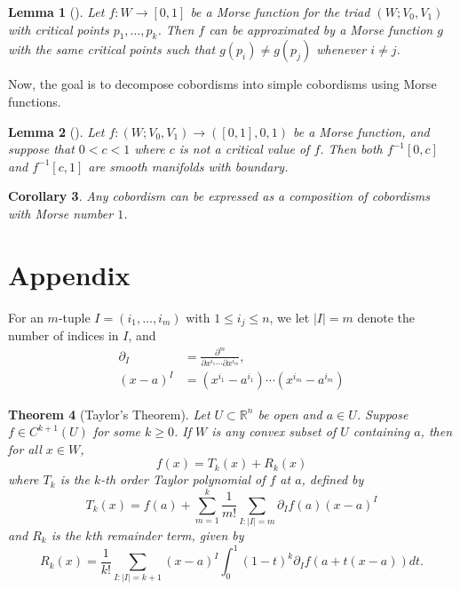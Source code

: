 \documentclass[reqno]{amsart}
\newtheorem{theorem}{Theorem}[section]
\newtheorem{lemma}[theorem]{Lemma}
\newtheorem{corollary}[theorem]{Corollary}
\theoremstyle{definition}
\theoremstyle{remark}
\begin{document}
   \begin{lemma}[]
       Let $f \colon W \to \left[ 0,1 \right] $ be a Morse
       function for the triad $\left( W;
       V_0,V_1\right) $ with critical points $p_1,\ldots,p_k$.
       Then $f$ can be approximated by a Morse function $g$ 
       with the same critical points such that
       $g\left( p_i \right)  \neq g\left( p_j \right) $ whenever
       $i \neq j$.
   \end{lemma}



   Now, the goal is to decompose cobordisms into
   simple cobordisms using Morse functions.

   \begin{lemma}[]
       Let $f \colon \left( W; V_0, V_1 \right) 
       \to \left( \left[ 0,1 \right] , 0, 1 \right) $ be
       a Morse function, and suppose that
       $0 < c < 1$ where $c $ is not a critical value of
       $f$. Then both
       $f^{-1}\left[ 0,c \right] $ and
       $f^{-1}\left[ c,1 \right] $ are smooth
       manifolds with boundary.
   \end{lemma}

   \begin{corollary}
       Any cobordism can be expressed as a composition
       of cobordisms with Morse number $1$.
   \end{corollary}
   
   \section{Appendix}

   For an $m$-tuple 
   $I = \left( i_1, \ldots, i_m \right) $ with
   $1 \le i_j \le n$, we let
   $\left| I \right| = m$ denote the number of indices
   in $I$, and
   \begin{align*}
       \partial_I 
       &= \frac{\partial^{m}}{\partial x^{i_1} \cdots
       \partial x^{i_m}},\\
       \left( x-a \right)^{I}
       &= \left( x^{i_1}-a^{i_1} \right) \cdots
       \left( x^{i_m} - a^{i_m} \right) 
   \end{align*}

   \begin{theorem}[Taylor's Theorem]
       Let $U \subset \mathbb{R}^{n}$ be open and
       $a \in U$. Suppose
       $f \in C^{k+1}(U)$ for some $k \ge 0$. If
       $W$ is any convex subset
       of $U$ containing $a$, then for all $x \in W$,
       \[
       f(x) = T_k(x) + R_k(x)
       \] 
       where
       $T_k$ is the \textit{$k$-th order Taylor
       polynomial of $f$ at $a$}, defined
       by
       \[
       T_k(x) = f(a) +
       \sum_{m=1}^{k} \frac{1}{m!} 
       \sum_{I \colon \left| I \right| =m}
       \partial_I f(a) (x-a)^{I}
       \] 
       and
       $R_k$ is the \textit{$k$th remainder term}, given
       by
       \[
       R_k(x) = \frac{1}{k!}
       \sum_{I \colon \left| I \right| =k+1}
       \left( x-a \right)^{I} \int_{0}^{1}
       (1-t)^{k} \partial_I f\left( a+ t(x-a) \right) dt.
       \] 
   \end{theorem}
\end{document}
